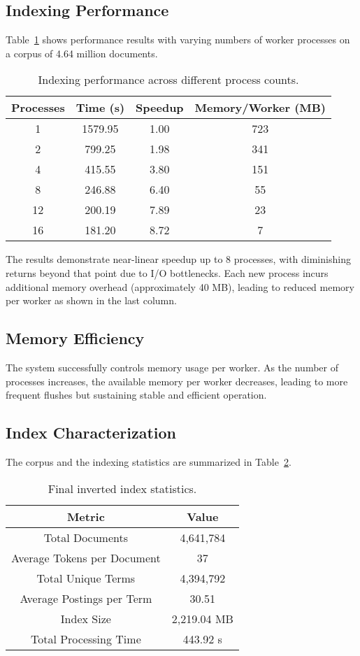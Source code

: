 \documentclass[sigconf]{acmart}
\begin{document}
\subsection{Indexing Performance}
Table~\ref{tab:indexing_performance} shows performance results with varying numbers of worker processes on a corpus of 4.64 million documents.

\begin{table}[H]
\centering
\begin{tabular}{|c|c|c|c|}
\hline
\textbf{Processes} & \textbf{Time (s)} & \textbf{Speedup} & \textbf{Memory/Worker (MB)} \\ \hline
1 & 1579.95 & 1.00 & 723 \\ \hline
2 & 799.25 & 1.98 & 341 \\ \hline
4 & 415.55 & 3.80 & 151 \\ \hline
8 & 246.88 & 6.40 & 55 \\ \hline
12 & 200.19 & 7.89 & 23 \\ \hline
16 & 181.20 & 8.72 & 7 \\ \hline
\end{tabular}
\caption{Indexing performance across different process counts.}
\label{tab:indexing_performance}
\end{table}

The results demonstrate near-linear speedup up to 8 processes, with diminishing returns beyond that point due to I/O bottlenecks. Each new process incurs additional memory overhead (approximately 40 MB), leading to reduced memory per worker as shown in the last column.

\subsection{Memory Efficiency}
The system successfully controls memory usage per worker. As the number of processes increases, the available memory per worker decreases, leading to more frequent flushes but sustaining stable and efficient operation.

\subsection{Index Characterization} \label{index-characterization}
The corpus and the indexing statistics are summarized in Table~\ref{tab:index_stats}.
\begin{table}[H]
\centering
\begin{tabular}{|c|c|}
\hline
\textbf{Metric} & \textbf{Value} \\ \hline
Total Documents & 4,641,784 \\ \hline
Average Tokens per Document & 37 \\ \hline
Total Unique Terms & 4,394,792 \\ \hline
Average Postings per Term & 30.51 \\ \hline
Index Size & 2,219.04 MB \\ \hline
Total Processing Time & 443.92 s \\ \hline
\end{tabular}
\caption{Final inverted index statistics.}
\label{tab:index_stats}
\end{table}
\end{document}
